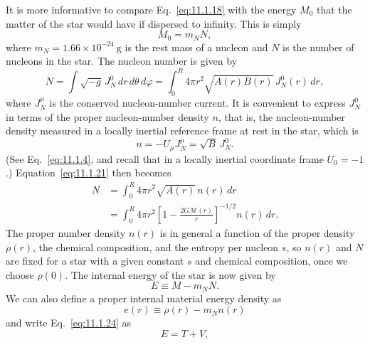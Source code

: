 It is more informative to compare Eq.~\eqref{eq:11.1.18} with the energy
\(M_0\) that the matter of the star would have if dispersed to infinity. This
is simply
\begin{equation}
  M_0=m_NN,
  \tag{11.1.20}\label{eq:11.1.20}
\end{equation}
where \(m_N=1.66\times10^{-24}\ \mathrm{g}\) is the rest mass of a nucleon and
\(N\) is the number of nucleons in the star. The nucleon number is given by
\begin{equation}
  N
  =
  \int\sqrt{-g}\,J_N^0\,dr\,d\theta\,d\varphi
  =
  \int_0^R4\pi r^2\sqrt{A(r)B(r)}\,J_N^0(r)\,dr,
  \tag{11.1.21}\label{eq:11.1.21}
\end{equation}
where \(J_N^\mu\) is the conserved nucleon-number current. It is convenient
to express \(J_N^0\) in terms of the proper nucleon-number density \(n\), that
is, the nucleon-number density measured in a locally inertial reference frame
at rest in the star, which is
\begin{equation}
  n=-U_\mu J_N^\mu=\sqrt{B}\,J_N^0.
  \tag{11.1.22}\label{eq:11.1.22}
\end{equation}
(See Eq.~\eqref{eq:11.1.4}, and recall that in a locally inertial coordinate
frame \(U_0=-1\).) Equation~\eqref{eq:11.1.21} then becomes
\begin{equation}
  \begin{split}
  N
  &=
  \int_0^R4\pi r^2\sqrt{A(r)}\,n(r)\,dr\\
  &=
  \int_0^R4\pi r^2
  \left[1-\frac{2G\mathcal{M}(r)}r\right]^{-1/2}
  n(r)\,dr.
  \end{split}
  \tag{11.1.23}\label{eq:11.1.23}
\end{equation}
The proper number density \(n(r)\) is in general a function of the proper
density \(\rho(r)\), the chemical composition, and the entropy per nucleon
\(s\), so \(n(r)\) and \(N\) are fixed for a star with a given constant \(s\)
and chemical composition, once we choose \(\rho(0)\). The internal energy of
the star is now given by
\begin{equation}
  E\equiv M-m_NN.
  \tag{11.1.24}\label{eq:11.1.24}
\end{equation}
We can also define a proper internal material energy density as
\begin{equation}
  e(r)\equiv\rho(r)-m_Nn(r)
  \tag{11.1.25}\label{eq:11.1.25}
\end{equation}
and write Eq.~\eqref{eq:11.1.24} as
\begin{equation}
  E=T+V,
  \tag{11.1.26}\label{eq:11.1.26}
\end{equation}
